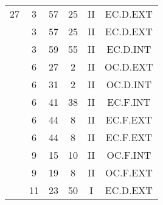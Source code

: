 \documentclass[12pt, a4paper]{article}
\begin{document}
\begin{multicols}{3}
{\begin{tabular}{c c c c c c}
	 	 	 	27 & 3 & 57 & 25 & II & EC.D.EXT\\%
	 	 	 	 & 3 & 57 & 25 & II & EC.D.EXT\\%
	 	 	 	 & 3 & 59 & 55 & II & EC.D.INT\\%
	 	 	 	 & 6 & 27 & 2 & II & OC.D.EXT\\%
	 	 	 	 & 6 & 31 & 2 & II & OC.D.INT\\%
	 	 	 	 & 6 & 41 & 38 & II & EC.F.INT\\%
	 	 	 	 & 6 & 44 & 8 & II & EC.F.EXT\\%
	 	 	 	 & 6 & 44 & 8 & II & EC.F.EXT\\%
	 	 	 	 & 9 & 15 & 10 & II & OC.F.INT\\%
	 	 	 	 & 9 & 19 & 8 & II & OC.F.EXT\\%
	 	 	 	 & 11 & 23 & 50 & I & EC.D.EXT\\%
	 	 \end{tabular}
 	}
\end{multicols}
\end{document}
